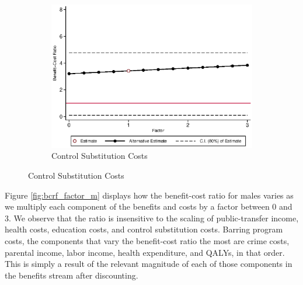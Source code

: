 \begin{figure}[H]
\ContinuedFloat		
	\begin{subfigure}[h]{0.8\textwidth}
	\centering
	\caption{Control Substitution Costs} \label{fig:bcrf_cc_f1}
	\includegraphics[width=\textwidth]{AppOutput/Sensitivity/bcrf_cc_f1.eps}
	\end{subfigure}
	
\end{figure}

\noindent Figure \ref{fig:bcrf_factor_m} displays how the benefit-cost ratio for males varies
as we multiply each component of the benefits and costs by a factor between 0 and 3.
We observe that the ratio is insensitive to the scaling of public-transfer income, health costs,
education costs, and control substitution costs. Barring program costs, the components that
vary the benefit-cost ratio the most are crime costs, parental income, labor income,
health expenditure, and QALYs, in that order. This is simply a result of the relevant 
magnitude of each of those components in the benefits stream after discounting. 


